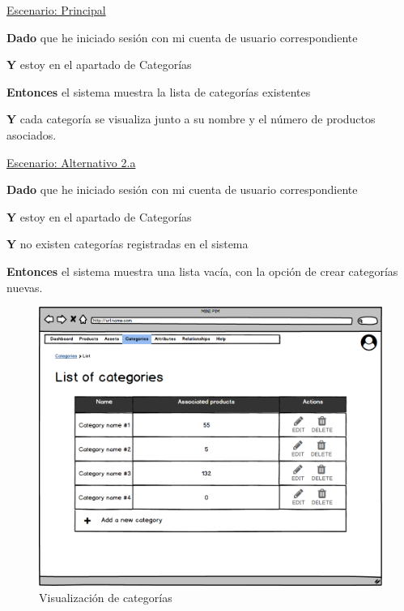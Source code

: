 \underline{Escenario: Principal}\par
\vspace{0.15cm}

\textbf{Dado} que he iniciado sesión con mi cuenta de usuario correspondiente\par
\textbf{Y} estoy en el apartado de Categorías\par
\textbf{Entonces} el sistema muestra la lista de categorías existentes\par
\textbf{Y} cada categoría se visualiza junto a su nombre y el número de productos asociados.\par


\vspace{0.20cm}

\underline{Escenario: Alternativo 2.a}\par
\vspace{0.15cm}

\textbf{Dado} que he iniciado sesión con mi cuenta de usuario correspondiente\par
\textbf{Y} estoy en el apartado de Categorías\par
\textbf{Y} no existen categorías registradas en el sistema\par
\textbf{Entonces} el sistema muestra una lista vacía, con la opción de crear categorías nuevas.\par



\vspace{0.20cm}

\begin{figure}[H]
    \includegraphics[width=1\linewidth]{mockups/RF4.2_1.png}
    \caption{Visualización de categorías}
   \end{figure}
\vspace{1.0cm}

